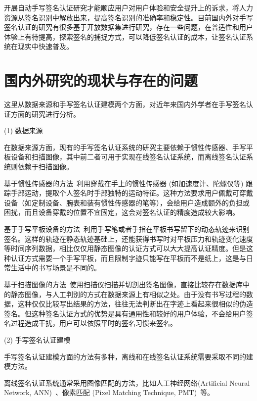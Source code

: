 开展自动手写签名认证研究才能顺应用户对用户体验和安全提升上的诉求，将人力资源从签名识别中解放出来，提高签名识别的准确率和稳定性。目前国内外对手写签名认证的研究有很多基于开放数据集进行研究，存在一些问题，在普适性和用户体验上有待提高，探索签名的捕捉方式，可以降低签名认证的成本，让签名认证系统在现实中快速普及。

\section{国内外研究的现状与存在的问题}
这里从数据来源和手写签名认证建模两个方面，对近年来国内外学者在手写签名认证方面的研究进行分析。

(1) 数据来源

在数据来源方面，现有的手写签名认证系统的研究主要依赖于惯性传感器、手写平板设备和扫描图像，其中前二者可用于实现在线签名认证系统，而离线签名认证系统则依赖于扫描图像。

基于惯性传感器的方法~\cite{levy2018handwritten,griswold2019wearables,bunke2011online}利用穿戴在手上的惯性传感器 (如加速度计、陀螺仪等) 跟踪手部运动，提取个人签名时手部独特的运动特征。这种方法要求用户佩戴可穿戴设备（如定制设备、腕表和装有惯性传感器的笔等），会给用户造成额外的负担或困扰，而且设备穿戴的位置不宜固定，这会对签名认证的精度造成较大影响。

基于手写平板设备的方法~\cite{fischer2015robust,kholmatov2005identity,sae2013simple}利用手写笔或者手指在平板书写留下的动态轨迹来识别签名。这样的轨迹在静态轨迹基础上，还能获得书写时对平板压力和轨迹变化速度等时间序列数据，相比仅仅用静态图像的认证方式可以大大提高认证精度。但是这种认证方式需要一个手写平板，而且限制字迹只能写在平板而不是纸上，这是与日常生活中的书写场景是不同的。

基于扫描图像的方法~\cite{hafemann2017learning,hafemann2018fixed,ferrer2005offline,kalera2004offline}使用扫描仪扫描并切割出签名图像，直接比较存在数据库中的静态图像，与人工判别的方式在数据来源上有相似之处。由于没有书写过程的数据，这种仅仅比较写出结果的方法，往往无法判断出在字迹上看起来很相似的伪造签名。但这种签名认证方式的优势是具有通用性和较好的用户体验，不会给用户签名过程造成干扰，用户可以依照平时的签名习惯来签名。

(2) 手写签名认证建模

手写签名认证建模方面的方法有多种，离线和在线签名认证系统需要采取不同的建模方法。

离线签名认证系统通常采用图像匹配的方法，比如人工神经网络(Artificial Neural Network, ANN)~\cite{chandra2016offline}、像素匹配 (Pixel Matching Technique, PMT)~\cite{bhattacharya2013offline}等。 

